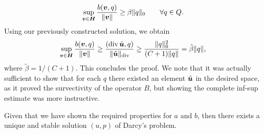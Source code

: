 \documentclass{article}
\renewcommand{\vec}{\vectorsym}
\DeclareMathOperator{\dive}{\text{div}}
\begin{document}
\begin{itemize}
        \[ \sup_{\vec v\in \vec H}\frac{b(\vec v, q)}{\|\vec v\|} \geq \beta \|q\|_0 \qquad \forall q \in Q.\]
        Using our previously constructed solution, we obtain
        \[ \sup_{\vec v\in \vec H}\frac{b(\vec v, q)}{\|\vec v\|} \geq \frac{(\dive \tilde{\vec u}, q)}{\|\tilde{\vec u}\|_{\dive}}\geq \frac{\|q\|_0^2}{(C+1)\|q\|} = \tilde\beta \|q\|, \]
        where $\tilde \beta = 1/(C+1)$. This concludes the proof. We note that it was actually sufficient to show that for each $q$ there existed an element $\tilde{\vec u}$ in the desired space, as it proved the survectivity of the operator $B$, but showing the complete inf-sup estimate was more instructive. 
    \end{itemize}
    Given that we have shown the required properties for $a$ and $b$, then there exists a unique and stable solution $(u,p)$ of Darcy's problem. 

\end{document}

